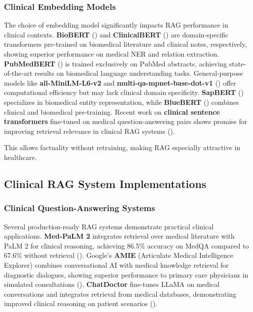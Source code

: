 \subsubsection{Clinical Embedding Models}
The choice of embedding model significantly impacts RAG performance in clinical contexts. \textbf{BioBERT} (\citep{lee2020biobert}) and \textbf{ClinicalBERT} (\citep{alsentzer2019clinicalbert}) are domain-specific transformers pre-trained on biomedical literature and clinical notes, respectively, showing superior performance on medical NER and relation extraction. \textbf{PubMedBERT} (\citep{gu2021pubmedbert}) is trained exclusively on PubMed abstracts, achieving state-of-the-art results on biomedical language understanding tasks. General-purpose models like \textbf{all-MiniLM-L6-v2} and \textbf{multi-qa-mpnet-base-dot-v1} (\citep{reimers2019sentencebert}) offer computational efficiency but may lack clinical domain specificity. \textbf{SapBERT} (\citep{liu2021sapbert}) specializes in biomedical entity representation, while \textbf{BlueBERT} (\citep{peng2019bluebert}) combines clinical and biomedical pre-training. Recent work on \textbf{clinical sentence transformers} fine-tuned on medical question-answering pairs shows promise for improving retrieval relevance in clinical RAG systems (\citep{zhang2023clinical}).

This allows factuality without retraining, making RAG especially attractive in healthcare.

\subsection{Clinical RAG System Implementations}

\subsubsection{Clinical Question-Answering Systems}
Several production-ready RAG systems demonstrate practical clinical applications. \textbf{Med-PaLM 2} integrates retrieval over medical literature with PaLM 2 for clinical reasoning, achieving 86.5\% accuracy on MedQA compared to 67.6\% without retrieval (\citep{singhal2023medpalm2}). Google's \textbf{AMIE} (Articulate Medical Intelligence Explorer) combines conversational AI with medical knowledge retrieval for diagnostic dialogues, showing superior performance to primary care physicians in simulated consultations (\citep{tu2024amie}). \textbf{ChatDoctor} fine-tunes LLaMA on medical conversations and integrates retrieval from medical databases, demonstrating improved clinical reasoning on patient scenarios (\citep{li2023chatdoctor}).

